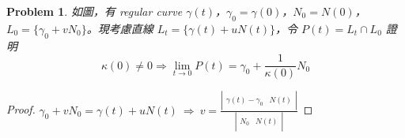 \documentclass[10pt,a4paper]{article}
\newcounter{theProblemCounter}
\newtheorem{problem}[theProblemCounter]{Problem}
\begin{document}
\setcounter{theProblemCounter}{8}
\begin{problem}
如圖，有 regular curve $\gamma(t)$，$\gamma_0=\gamma(0)$，$N_0=N(0)$，$L_0=\{\gamma_0+vN_0\}$。現考慮直線 $L_t=\{\gamma(t)+uN(t)\}$，令 $P(t)=L_t\cap L_0$ 證明
\[\kappa(0)\ne 0\Rightarrow \lim_{t\to 0}P(t)=\gamma_0 + \frac{1}{\kappa(0)}N_0\]
\end{problem}
\begin{proof}
$\gamma_0+vN_0=\gamma(t)+uN(t)\ \Rightarrow\ v=\frac{\left|\begin{array}{cc}\ &\ \\ \gamma(t)-\gamma_0&N(t)\\\ &\ \end{array}\right|}{\left|\begin{array}{cc}\ &\ \\ N_0& N(t)\\\ &\ \end{array}\right|}$
\end{proof}
\end{document}
